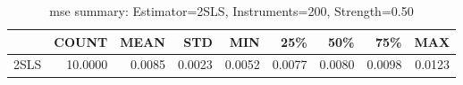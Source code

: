 \begin{table}[ht]
\centering
\caption{mse summary: Estimator=2SLS, Instruments=200, Strength=0.50}
\begin{tabular}{lrrrrrrrr}
\toprule
 & COUNT & MEAN & STD & MIN & 25\% & 50\% & 75\% & MAX \\
\midrule
2SLS & 10.0000 & 0.0085 & 0.0023 & 0.0052 & 0.0077 & 0.0080 & 0.0098 & 0.0123 \\
\bottomrule
\end{tabular}
\end{table}
